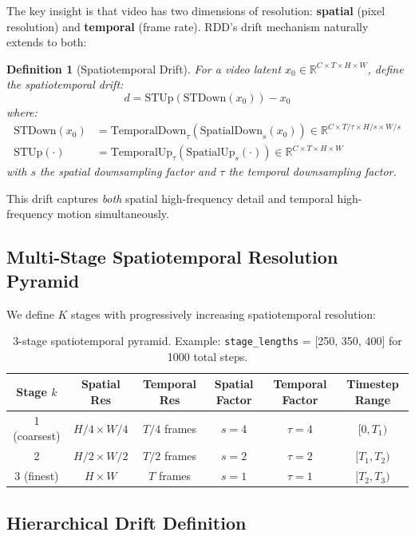 \documentclass[11pt,a4paper]{article}
\newtheorem{definition}{Definition}
\begin{document}
The key insight is that video has two dimensions of resolution: \textbf{spatial} (pixel resolution) and \textbf{temporal} (frame rate). RDD's drift mechanism naturally extends to both:

\begin{definition}[Spatiotemporal Drift]
For a video latent $x_0 \in \mathbb{R}^{C \times T \times H \times W}$, define the spatiotemporal drift:
\begin{equation}
d = \text{STUp}(\text{STDown}(x_0)) - x_0
\end{equation}
where:
\begin{align}
\text{STDown}(x_0) &= \text{TemporalDown}_{\tau}(\text{SpatialDown}_s(x_0)) \in \mathbb{R}^{C \times T/\tau \times H/s \times W/s} \\
\text{STUp}(\cdot) &= \text{TemporalUp}_{\tau}(\text{SpatialUp}_s(\cdot)) \in \mathbb{R}^{C \times T \times H \times W}
\end{align}
with $s$ the spatial downsampling factor and $\tau$ the temporal downsampling factor.
\end{definition}

This drift captures \emph{both} spatial high-frequency detail and temporal high-frequency motion simultaneously.

\subsection{Multi-Stage Spatiotemporal Resolution Pyramid}

We define $K$ stages with progressively increasing spatiotemporal resolution:

\begin{table}[h]
\centering
\begin{tabular}{cccccc}
\toprule
Stage $k$ & Spatial Res & Temporal Res & Spatial Factor & Temporal Factor & Timestep Range \\
\midrule
1 (coarsest) & $H/4 \times W/4$ & $T/4$ frames & $s=4$ & $\tau=4$ & $[0, T_1)$ \\
2 & $H/2 \times W/2$ & $T/2$ frames & $s=2$ & $\tau=2$ & $[T_1, T_2)$ \\
3 (finest) & $H \times W$ & $T$ frames & $s=1$ & $\tau=1$ & $[T_2, T_3)$ \\
\bottomrule
\end{tabular}
\caption{3-stage spatiotemporal pyramid. Example: \texttt{stage\_lengths} = [250, 350, 400] for 1000 total steps.}
\end{table}

\subsection{Hierarchical Drift Definition}
\end{document}

